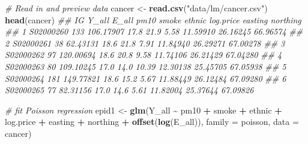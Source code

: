 \documentclass[
]{book}
\newenvironment{Shaded}{\begin{snugshade}}{\end{snugshade}}
\newcommand{\CommentTok}[1]{\textcolor[rgb]{0.56,0.35,0.01}{\textit{#1}}}
\newcommand{\DataTypeTok}[1]{\textcolor[rgb]{0.13,0.29,0.53}{#1}}
\newcommand{\KeywordTok}[1]{\textcolor[rgb]{0.13,0.29,0.53}{\textbf{#1}}}
\newcommand{\NormalTok}[1]{#1}
\newcommand{\OperatorTok}[1]{\textcolor[rgb]{0.81,0.36,0.00}{\textbf{#1}}}
\newcommand{\StringTok}[1]{\textcolor[rgb]{0.31,0.60,0.02}{#1}}
\theoremstyle{definition}
\theoremstyle{definition}
\theoremstyle{definition}
\theoremstyle{remark}
\begin{document}
\begin{Shaded}
\begin{Highlighting}[]
\CommentTok{\# Read in and preview data}
\NormalTok{cancer \textless{}{-}}\StringTok{ }\KeywordTok{read.csv}\NormalTok{(}\StringTok{"data/lm/cancer.csv"}\NormalTok{)}
\KeywordTok{head}\NormalTok{(cancer)}
\CommentTok{\#\#          IG Y\_all     E\_all pm10 smoke ethnic log.price  easting northing}
\CommentTok{\#\# 1 S02000260   133 106.17907 17.8  21.9   5.58  11.59910 26.16245 66.96574}
\CommentTok{\#\# 2 S02000261    38  62.43131 18.6  21.8   7.91  11.84940 26.29271 67.00278}
\CommentTok{\#\# 3 S02000262    97 120.00694 18.6  20.8   9.58  11.74106 26.21429 67.04280}
\CommentTok{\#\# 4 S02000263    80 109.10245 17.0  14.0  10.39  12.30138 25.45705 67.05938}
\CommentTok{\#\# 5 S02000264   181 149.77821 18.6  15.2   5.67  11.88449 26.12484 67.09280}
\CommentTok{\#\# 6 S02000265    77  82.31156 17.0  14.6   5.61  11.82004 25.37644 67.09826}

\CommentTok{\# fit Poisson regression}
\NormalTok{epid1 \textless{}{-}}\StringTok{ }\KeywordTok{glm}\NormalTok{(Y\_all }\OperatorTok{\textasciitilde{}}\StringTok{ }\NormalTok{pm10 }\OperatorTok{+}\StringTok{ }\NormalTok{smoke }\OperatorTok{+}\StringTok{ }\NormalTok{ethnic }\OperatorTok{+}\StringTok{ }\NormalTok{log.price }\OperatorTok{+}\StringTok{ }\NormalTok{easting }\OperatorTok{+}\StringTok{ }\NormalTok{northing }\OperatorTok{+}\StringTok{ }\KeywordTok{offset}\NormalTok{(}\KeywordTok{log}\NormalTok{(E\_all)), }
             \DataTypeTok{family =}\NormalTok{ poisson, }
             \DataTypeTok{data =}\NormalTok{ cancer)}


\end{Highlighting}
\end{Shaded}
\end{document}
